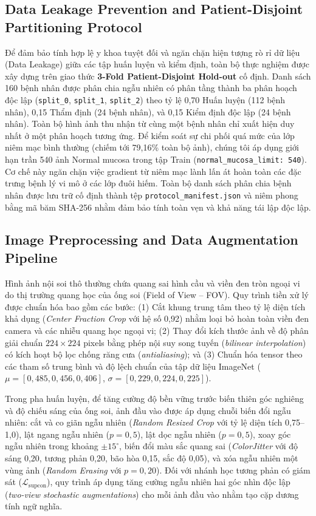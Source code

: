 \documentclass[runningheads]{llncs}
\begin{document}
\subsection{Data Leakage Prevention and Patient-Disjoint Partitioning Protocol}
Để đảm bảo tính hợp lệ y khoa tuyệt đối và ngăn chặn hiện tượng rò rỉ dữ liệu (Data Leakage) giữa các tập huấn luyện và kiểm định, toàn bộ thực nghiệm được xây dựng trên giao thức \textbf{3-Fold Patient-Disjoint Hold-out} cố định. Danh sách 160 bệnh nhân được phân chia ngẫu nhiên có phân tầng thành ba phân hoạch độc lập (\texttt{split\_0}, \texttt{split\_1}, \texttt{split\_2}) theo tỷ lệ 0,70 Huấn luyện (112 bệnh nhân), 0,15 Thẩm định (24 bệnh nhân), và 0,15 Kiểm định độc lập (24 bệnh nhân). Toàn bộ hình ảnh thu nhận từ cùng một bệnh nhân chỉ xuất hiện duy nhất ở một phân hoạch tương ứng. Để kiểm soát sự chi phối quá mức của lớp niêm mạc bình thường (chiếm tới 79,16\% toàn bộ ảnh), chúng tôi áp dụng giới hạn trần 540 ảnh Normal mucosa trong tập Train (\texttt{normal\_mucosa\_limit: 540}). Cơ chế này ngăn chặn việc gradient từ niêm mạc lành lấn át hoàn toàn các đặc trưng bệnh lý vi mô ở các lớp đuôi hiếm. Toàn bộ danh sách phân chia bệnh nhân được lưu trữ cố định thành tệp \texttt{protocol\_manifest.json} và niêm phong bằng mã băm SHA-256 nhằm đảm bảo tính toàn vẹn và khả năng tái lập độc lập.

\subsection{Image Preprocessing and Data Augmentation Pipeline}
Hình ảnh nội soi thô thường chứa quang sai hình cầu và viền đen tròn ngoại vi do thị trường quang học của ống soi (Field of View -- FOV). Quy trình tiền xử lý được chuẩn hóa bao gồm các bước: (1) Cắt khung trung tâm theo tỷ lệ diện tích khả dụng (\textit{Center Fraction Crop} với hệ số 0,92) nhằm loại bỏ hoàn toàn viền đen camera và các nhiễu quang học ngoại vi; (2) Thay đổi kích thước ảnh về độ phân giải chuẩn $224 \times 224$ pixels bằng phép nội suy song tuyến (\textit{bilinear interpolation}) có kích hoạt bộ lọc chống răng cưa (\textit{antialiasing}); và (3) Chuẩn hóa tensor theo các tham số trung bình và độ lệch chuẩn của tập dữ liệu ImageNet ($\mu = [0{,}485, 0{,}456, 0{,}406]$, $\sigma = [0{,}229, 0{,}224, 0{,}225]$).

Trong pha huấn luyện, để tăng cường độ bền vững trước biến thiên góc nghiêng và độ chiếu sáng của ống soi, ảnh đầu vào được áp dụng chuỗi biến đổi ngẫu nhiên: cắt và co giãn ngẫu nhiên (\textit{Random Resized Crop} với tỷ lệ diện tích 0,75--1,0), lật ngang ngẫu nhiên ($p=0{,}5$), lật dọc ngẫu nhiên ($p=0{,}5$), xoay góc ngẫu nhiên trong khoảng $\pm 15^\circ$, biến đổi màu sắc quang sai (\textit{ColorJitter} với độ sáng 0,20, tương phản 0,20, bão hòa 0,15, sắc độ 0,05), và xóa ngẫu nhiên một vùng ảnh (\textit{Random Erasing} với $p=0{,}20$). Đối với nhánh học tương phản có giám sát ($\mathcal{L}_{\text{supcon}}$), quy trình áp dụng tăng cường ngẫu nhiên hai góc nhìn độc lập (\textit{two-view stochastic augmentations}) cho mỗi ảnh đầu vào nhằm tạo cặp dương tính ngữ nghĩa.
\end{document}
